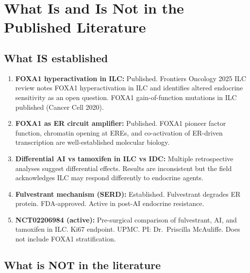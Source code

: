 \documentclass[12pt, a4paper]{article}
\begin{document}
\section{What Is and Is Not in the Published
Literature}

\subsection{What IS established}

\begin{enumerate}
    \item \textbf{FOXA1 hyperactivation in ILC:}
    Published. Frontiers Oncology 2025 ILC review
    notes FOXA1 hyperactivation in ILC and
    identifies altered endocrine sensitivity as
    an open question. FOXA1 gain-of-function
    mutations in ILC published (Cancer Cell 2020).

    \item \textbf{FOXA1 as ER circuit amplifier:}
    Published. FOXA1 pioneer factor function,
    chromatin opening at EREs, and co-activation
    of ER-driven transcription are well-established
    molecular biology.

    \item \textbf{Differential AI vs tamoxifen
    in ILC vs IDC:}
    Multiple retrospective analyses suggest
    differential effects. Results are inconsistent
    but the field acknowledges ILC may respond
    differently to endocrine agents.

    \item \textbf{Fulvestrant mechanism (SERD):}
    Established. Fulvestrant degrades ER protein.
    FDA-approved. Active in post-AI endocrine
    resistance.

    \item \textbf{NCT02206984 (active):}
    Pre-surgical comparison of fulvestrant, AI,
    and tamoxifen in ILC. Ki67 endpoint. UPMC.
    PI: Dr.\ Priscilla McAuliffe. Does not include
    FOXA1 stratification.
\end{enumerate}

\subsection{What is NOT in the literature}
\end{document}

